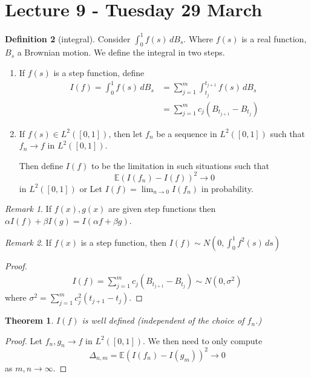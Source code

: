 \documentclass[10pt, oneside, reqno]{amsart}
\theoremstyle{plain}%
\newtheorem{thm}{Theorem}[section]
\theoremstyle{definition}
\newtheorem{defn}[thm]{Definition}
\theoremstyle{remark}
\newtheorem*{rem}{Remark}
\newcommand{\E}{\mathbb{E}}
\begin{document}
\section{Lecture 9 - Tuesday 29 March} %
\newcommand{\ito}{}
\label{sec:lecture_9_tuesday_29_march}
\begin{defn}[\ito integral]
	Consider $\int_0^1 f(s) \, dB_s$.  Where $f(s)$ is a real function, $B_s$ a Brownian motion.  We define the integral in two steps.  
	\begin{enumerate}[(1)]
		\item If $f(s)$ is a step function, define 
		\begin{align*}
			I(f) = \int_0^1 f(s) \, dB_s 	&= \sum_{j=1}^m \int_{t_j}^{t_{j+1}} f(s) \, dB_s \\
									&= \sum_{j=1}^m c_j (B_{t_{j+1}} - B_{t_j})
		\end{align*}
		
		\item If $f(s) \in L^2([0,1])$, then let $f_n$ be a sequence in $L^2([0,1])$ such that $f_n \rightarrow f$ in $L^2([0,1])$.  
		
		Then define $I(f)$ to be the limitation in such situations such that \[
			\E(I(f_n) - I(f))^2 \rightarrow 0 
		\] in $L^2([0,1])$ or 
		Let $I(f) = \lim_{n \rightarrow 0} I(f_n)$ in probability.
	\end{enumerate}
	
	\begin{rem}
		If $f(x), g(x)$ are given step functions then $\alpha I(f) + \beta I(g) = I ( \alpha f + \beta g)$.
	\end{rem}
	\begin{rem}
		If $f(x)$ is a step function, then $I(f) \sim N(0, \int_0^1 f^2(s) \, ds)$
	\end{rem}
	\begin{proof}
		\begin{align*}
			I(f) = \sum_{j=1}^m c_j (B_{t_{j+1}} - B_{t_j}) \sim N(0, \sigma^2) 
		\end{align*} where $\sigma^2 = \sum_{j=1}^m c_j^2 (t_{j+1} - t_j)$.
	\end{proof}
	
	\begin{thm}
		$I(f)$ is well defined (independent of the choice of $f_n$.)
	\end{thm}
	
	\begin{proof}
		Let $f_n, g_n \rightarrow f$ in $L^2([0,1])$.  We then need to only compute \[
			\Delta_{n,m} = \E(I(f_n) - I(g_m) )^2 \rightarrow 0
		\] as $m,n \rightarrow \infty$. 
		

\end{proof}
\end{defn}
\end{document}

